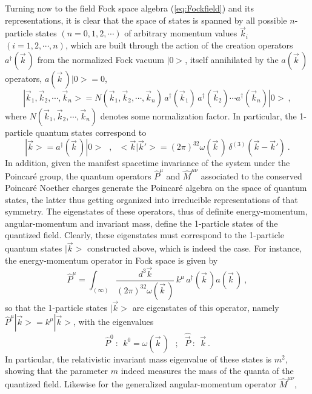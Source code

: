 \documentclass[a4paper,11pt]{article}
\begin{document}
Turning now to the field Fock space algebra (\ref{eq:Fockfield}) and
its representations, it is clear that the space of states is spanned
by all possible $n$-particle states $(n=0,1,2,\cdots)$ of arbitrary
momentum values $\vec{k}_i$ $(i=1,2,\cdots,n)$, which are built through the
action of the creation operators $a^\dagger(\vec{k}\,)$ from
the normalized Fock vacuum $|0>$, itself annihilated by the $a(\vec{k}\,)$
operators, $a(\vec{k}\,)|0>=0$, 
\begin{equation}
|\vec{k}_1,\vec{k}_2,\cdots,\vec{k}_n>=
N(\vec{k}_1,\vec{k}_2,\cdots,\vec{k}_n)\,
a^\dagger(\vec{k}_1)\,a^\dagger(\vec{k}_2)\cdots a^\dagger(\vec{k}_n)|0>\ ,
\end{equation}
where $N(\vec{k}_1,\vec{k}_2,\cdots,\vec{k}_n)$ denotes some normalization
factor. In particular, the 1-particle quantum states correspond to
\begin{equation}
|\vec{k}>=a^\dagger(\vec{k}\,)|0>\ \ \ ,\ \ \ 
<\vec{k}|\vec{k}'>=
(2\pi)^32\omega(\vec{k}\,)\,\delta^{(3)}\left(\vec{k}-\vec{k}'\right)\ .
\end{equation}
In addition, given the manifest spacetime invariance of the system under
the Poincar\'e group, the quantum operators $\hat{P}^\mu$ and 
$\hat{M}^{\mu\nu}$ associated to the conserved Poincar\'e Noether charges
generate the Poincar\'e algebra on the space of quantum states, the latter
thus getting organized into irreducible representations of that symmetry.
The eigenstates of these operators, thus of de\-fi\-ni\-te energy-momentum, 
angular-momentum and invariant mass, define the 1-particle states
of the quantized field. Clearly, these eigenstates must correspond to
the 1-particle quantum states $|\vec{k}>$ constructed above, which is
indeed the case. For instance, the energy-momentum operator in Fock space
is given by
\begin{equation}
\hat{P}^\mu=\int_{(\infty)}\frac{d^3\vec{k}}{(2\pi)^32\omega(\vec{k}\,)}\,
k^\mu\,a^\dagger(\vec{k}\,)a(\vec{k}\,)\ ,
\end{equation}
so that the 1-particle states $|\vec{k}>$ are eigenstates of
this operator, namely $\hat{P}^\mu|\vec{k}>=k^\mu|\vec{k}>$, with the
eigenvalues
\begin{equation}
\hat{P}^0\ :\ \ k^0=\omega(\vec{k}\,)\ \ \ ;\ \ \
\hat{\vec{P}}\ :\ \ \vec{k}\ .
\end{equation}
In particular, the relativistic invariant mass eigenvalue of
these states is $m^2$, showing that the parameter $m$ indeed
measures the mass of the quanta of the quantized field.
Likewise for the generalized angular-momentum operator $\hat{M}^{\mu\nu}$,
\end{document}
